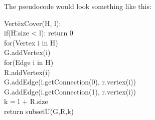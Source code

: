 \documentclass{article}
\begin{document}
\begin{enumerate}
The pseudocode would look something like this:
\begin{tabbing}
Vert\=exCover(H, l):\\
\>if(H\=.size < l): return 0\\
\>for(Vertex i in H)\\
\>\>G.addVertex(i)\\
\>for(Edge i in H)\\
\>\>R.addVertex(i)\\
\>\>G.addEdge(i.getConnection(0), r.vertex(i))\\
\>\>G.addEdge(i.getConnection(1), r.vertex(i))\\
\>k = l + R.size\\
\>return subsetU(G,R,k)\\
\end{tabbing}


\end{enumerate}
\end{document}
